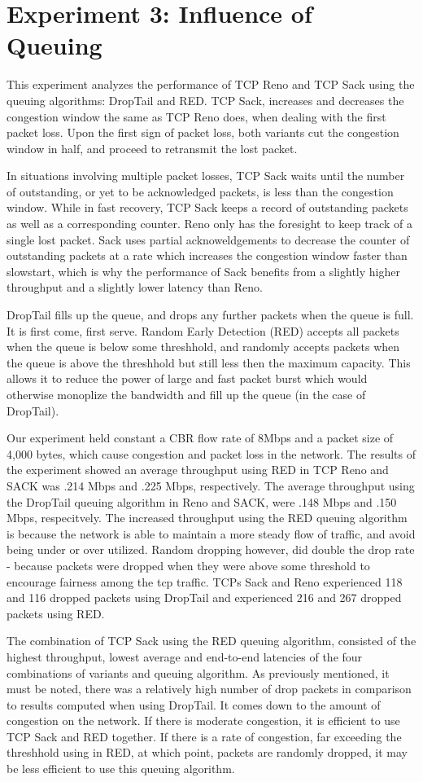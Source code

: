 \section{Experiment 3: Influence of Queuing}

This experiment analyzes the performance of TCP Reno and TCP Sack using the queuing algorithms: DropTail and RED. TCP Sack, increases and decreases the congestion window the same as TCP Reno does, when dealing with the first packet loss. Upon the first sign of packet loss, both variants cut the congestion window in half, and proceed to retransmit the lost packet. 

In situations involving multiple packet losses, TCP Sack waits until the number of outstanding, or yet to be acknowledged packets, is less than the congestion window. While in fast recovery, TCP Sack keeps a record of outstanding packets as well as a corresponding counter. Reno only has the foresight to keep track of a single lost packet. Sack uses partial acknoweldgements to decrease the counter of outstanding packets at a rate which increases the congestion window faster than slowstart, which is why the performance of Sack benefits from a slightly higher throughput and a slightly lower latency than Reno.

DropTail fills up the queue, and drops any further packets when the queue is full. It is first come, first serve. Random Early Detection (RED) accepts all packets when the queue is below some threshhold, and randomly accepts packets when the queue is above the threshhold but still less then the maximum capacity. This allows it to reduce the power of large and fast packet burst which would otherwise monoplize the bandwidth and fill up the queue (in the case of DropTail).

Our experiment held constant a CBR flow rate of 8Mbps and a packet size of 4,000 bytes, which cause congestion and packet loss in the network. The results of the experiment showed an average throughput using RED in TCP Reno and SACK was .214 Mbps and .225 Mbps, respectively. The average throughput using the DropTail queuing algorithm in Reno and SACK, were .148 Mbps and .150 Mbps, respecitvely. The increased throughput using the RED queuing algorithm is because the network is able to maintain a more steady flow of traffic, and avoid being under or over utilized. Random dropping however, did double the drop rate - because packets were dropped when they were above some threshold to encourage fairness among the tcp traffic. TCPs Sack and Reno experienced 118 and 116 dropped packets using DropTail and experienced 216 and 267 dropped packets using RED.

The combination of TCP Sack using the RED queuing algorithm, consisted of the highest throughput, lowest average and end-to-end latencies of the four combinations of variants and queuing algorithm. As previously mentioned, it must be noted, there was a relatively high number of drop packets in comparison to results computed when using DropTail. It comes down to the amount of congestion on the network. If there is moderate congestion, it is efficient to use TCP Sack and RED together. If there is a rate of congestion, far exceeding the threshhold using in RED, at which point, packets are randomly dropped, it may be less efficient to use this queuing algorithm.